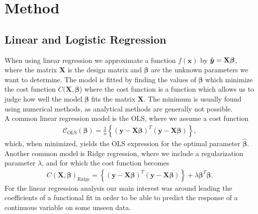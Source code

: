 \documentclass[english,notitlepage,reprint,nofootinbib]{revtex4-2}  %
\begin{document}
\section{Method}\label{sec:methods}

\subsection*{Linear and Logistic Regression}
When using linear regression we approximate a function $f(\boldsymbol{x})$ by $\Tilde{\boldsymbol{y}} = \mathbf{X}\boldsymbol{\beta}$, where the matrix $\mathbf{X}$ is the design matrix and $\boldsymbol{\beta}$ are the unknown parameters we want to determine. 
The model is fitted by finding the values of $\boldsymbol{\beta}$ which minimize the cost function $C(\mathbf{X}, \boldsymbol{\beta}$) where the cost function is a function which allows us to judge how well the model $\boldsymbol{\beta}$ fits the matrix $\mathbf{X}$. The minimum is usually found using numerical methods, as analytical methods are generally not possible. 
\vspace{3mm}
\\
A common linear regression model is the OLS, where we assume a cost function 
\begin{align}\label{eq: costfunc_OLS}
    \mathcal{C}_\text{OLS}(\boldsymbol{\beta}) = \frac{1}{n}\left\{(\boldsymbol{y} - \mathbf{X}\boldsymbol{\beta})^T (\boldsymbol{y} - \mathbf{X}\boldsymbol{\beta})\right\},
\end{align}
which, when minimized, yields the OLS expression for the optimal parameter $\hat{\boldsymbol{\beta}}$. 
Another common model is Ridge regression, where we include a regularization parameter $\lambda$, and for which the cost function becomes 
\begin{align}\label{eq: costfunc_ridge}
    C(\mathbf{X},\boldsymbol{\beta})_\text{Ridge} = \left\{ (\boldsymbol{y} - \mathbf{X}\boldsymbol{\beta})^T (\boldsymbol{y} - \mathbf{X}\boldsymbol{\beta}) \right\} + \lambda\boldsymbol{\beta}^T\boldsymbol{\beta}. 
\end{align}
For the linear regression analysis our main interest was around leading the coefficients of a functional fit in order to be able to predict the response of a continuous variable on some unseen data. 
\end{document}
